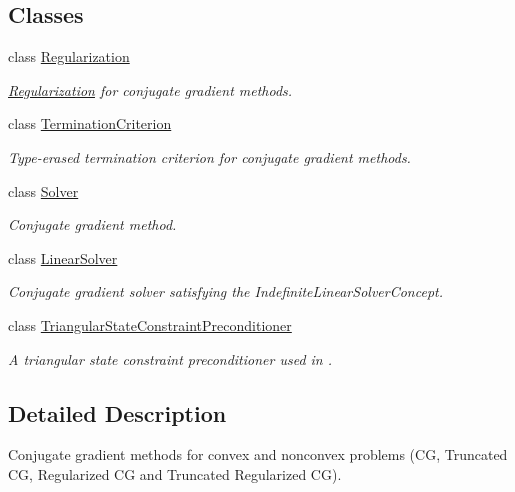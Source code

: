\subsection*{Classes}
\begin{DoxyCompactItemize}
\item 
class \hyperlink{classSpacy_1_1CG_1_1Regularization}{Regularization}
\begin{DoxyCompactList}\small\item\em \hyperlink{classSpacy_1_1CG_1_1Regularization}{Regularization} for conjugate gradient methods. \end{DoxyCompactList}\item 
class \hyperlink{classSpacy_1_1CG_1_1TerminationCriterion}{Termination\-Criterion}
\begin{DoxyCompactList}\small\item\em Type-\/erased termination criterion for conjugate gradient methods. \end{DoxyCompactList}\item 
class \hyperlink{classSpacy_1_1CG_1_1Solver}{Solver}
\begin{DoxyCompactList}\small\item\em Conjugate gradient method. \end{DoxyCompactList}\item 
class \hyperlink{classSpacy_1_1CG_1_1LinearSolver}{Linear\-Solver}
\begin{DoxyCompactList}\small\item\em Conjugate gradient solver satisfying the Indefinite\-Linear\-Solver\-Concept. \end{DoxyCompactList}\item 
class \hyperlink{classSpacy_1_1CG_1_1TriangularStateConstraintPreconditioner}{Triangular\-State\-Constraint\-Preconditioner}
\begin{DoxyCompactList}\small\item\em A triangular state constraint preconditioner used in \cite{Lubkoll2015a}. \end{DoxyCompactList}\end{DoxyCompactItemize}


\subsection{Detailed Description}
Conjugate gradient methods for convex and nonconvex problems (C\-G, Truncated C\-G, Regularized C\-G and Truncated Regularized C\-G). 